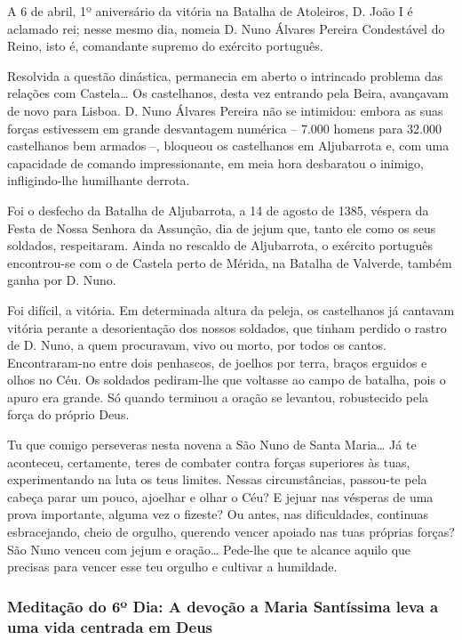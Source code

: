 \documentclass[a4paper,14pt]{extarticle} \usepackage[utf8]{inputenc}
\begin{document}
A 6 de abril, 1º aniversário da vitória na Batalha de Atoleiros, D. João I é aclamado rei; nesse mesmo dia, nomeia D. Nuno Álvares Pereira Condestável do Reino, isto é, comandante supremo do exército português.

Resolvida a questão dinástica, permanecia em aberto o intrincado problema das relações com Castela… Os castelhanos, desta vez entrando pela Beira, avançavam de novo para Lisboa. D. Nuno Álvares Pereira não se intimidou: embora as suas forças estivessem em grande desvantagem numérica – 7.000 homens para 32.000 castelhanos bem armados –, bloqueou os castelhanos em Aljubarrota e, com uma capacidade de comando impressionante, em meia hora desbaratou o inimigo, infligindo-lhe humilhante derrota.

Foi o desfecho da Batalha de Aljubarrota, a 14 de agosto de 1385, véspera da Festa de Nossa Senhora da Assunção, dia de jejum que, tanto ele como os seus soldados, respeitaram. Ainda no rescaldo de Aljubarrota, o exército português encontrou-se com o de Castela perto de Mérida, na Batalha de Valverde, também ganha por D. Nuno.

Foi difícil, a vitória. Em determinada altura da peleja, os castelhanos já cantavam vitória perante a desorientação dos nossos soldados, que tinham perdido o rastro de D. Nuno, a quem procuravam, vivo ou morto, por todos os cantos. Encontraram-no entre dois penhascos, de joelhos por terra, braços erguidos e olhos no Céu. Os soldados pediram-lhe que voltasse ao campo de batalha, pois o apuro era grande. Só quando terminou a oração se levantou, robustecido pela força do próprio Deus.

Tu que comigo perseveras nesta novena a São Nuno de Santa Maria… Já te aconteceu, certamente, teres de combater contra forças superiores às tuas, experimentando na luta os teus limites. Nessas circunstâncias, passou-te pela cabeça parar um pouco, ajoelhar e olhar o Céu? E jejuar nas vésperas de uma prova importante, alguma vez o fizeste? Ou antes, nas dificuldades, continuas esbracejando, cheio de orgulho, querendo vencer apoiado nas tuas próprias forças? São Nuno venceu com jejum e oração… Pede-lhe que te alcance aquilo que precisas para vencer esse teu orgulho e cultivar a humildade.


\subsubsection{Meditação do 6º Dia: A devoção a Maria Santíssima leva a uma vida centrada em Deus}
\end{document}

